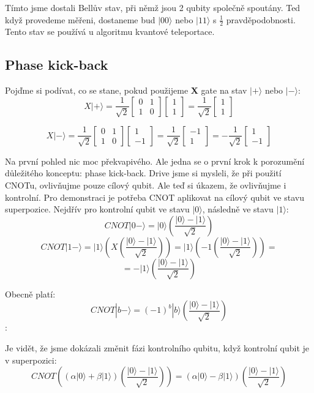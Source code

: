 \documentclass[11pt]{article}
\begin{document}
\par Tímto jsme dostali Bellův stav, při němž jsou 2 qubity společně spoutány.
Ted když provedeme měřeni, dostaneme bud $|00\rangle$ nebo $|11\rangle$ s $\frac{1}{2}$ pravděpodobnosti.
Tento stav se používá u algoritmu kvantové teleportace.

\subsection{Phase kick-back}
\label{sec:phase_kickback}
Pojďme si podívat, co se stane, pokud použijeme \textbf{X} gate na stav $|+\rangle$ nebo $|-\rangle$:
$$X|+\rangle = \frac{1}{\sqrt{2}}\begin{bmatrix}
        0 & 1 \\
        1 & 0
    \end{bmatrix} \begin{bmatrix}
        1 \\
        1
    \end{bmatrix} = \frac{1}{\sqrt{2}} \begin{bmatrix}
        1 \\
        1
    \end{bmatrix} $$

$$X|-\rangle = \frac{1}{\sqrt{2}}\begin{bmatrix}
        0 & 1 \\
        1 & 0
    \end{bmatrix} \begin{bmatrix}
        1 \\
        -1
    \end{bmatrix} = \frac{1}{\sqrt{2}} \begin{bmatrix}
        -1 \\
        1
    \end{bmatrix} = -\frac{1}{\sqrt{2}} \begin{bmatrix}
        1 \\
        -1
    \end{bmatrix} $$
\par Na první pohled nic moc překvapivého.
Ale jedna se o první krok k porozumění důležitého konceptu: phase kick-back.
Drive jsme si mysleli, že při použití CNOTu, ovlivňujme pouze cílový qubit.
Ale teď si úkazem, že ovlivňujme i kontrolní.
Pro demonstraci je potřeba CNOT aplikovat na cílový qubit ve stavu superpozice.
Nejdřív pro kontrolní qubit ve stavu $|0\rangle$, následně ve stavu $|1\rangle$:
$$CNOT |0-\rangle = |0\rangle \left(\frac{|0\rangle - |1\rangle}{\sqrt{2}}\right)$$
$$CNOT |1-\rangle = |1\rangle \left(X \left(\frac{|0\rangle - |1\rangle}{\sqrt{2}}\right)\right) = |1\rangle \left(-1\left(\frac{|0\rangle - |1\rangle}{\sqrt{2}}\right)\right) =$$
$$= -|1\rangle \left(\frac{|0\rangle - |1\rangle}{\sqrt{2}}\right)$$
\par Obecně platí:
$$CNOT |b-\rangle = (-1)^b|b\rangle\left(\frac{|0\rangle - |1\rangle}{\sqrt{2}}\right)$$:
\par Je vidět, že jsme dokázali změnit fázi kontrolního qubitu, když kontrolní qubit je v superpozici:
$$CNOT\left((\alpha|0\rangle + \beta|1\rangle)\left(\frac{|0\rangle - |1\rangle}{\sqrt{2}}\right)\right) = (\alpha|0\rangle - \beta|1\rangle)\left(\frac{|0\rangle - |1\rangle}{\sqrt{2}}\right)$$
\newpage
\end{document}
